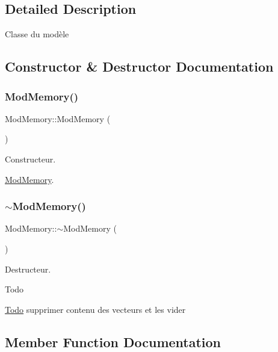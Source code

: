\subsection{Detailed Description}
Classe du modèle 

\subsection{Constructor \& Destructor Documentation}
\mbox{\label{class_mod_memory_a8604678a120d5f8e430d5d2248a44e36}} 
\subsubsection{\texorpdfstring{Mod\+Memory()}{ModMemory()}}
{\footnotesize\ttfamily Mod\+Memory\+::\+Mod\+Memory (\begin{DoxyParamCaption}{ }\end{DoxyParamCaption})}



Constructeur. 

\hyperlink{class_mod_memory}{Mod\+Memory}. \mbox{\label{class_mod_memory_a77d39288e861c84edcfa760170fbc44d}} 
\subsubsection{\texorpdfstring{$\sim$\+Mod\+Memory()}{~ModMemory()}}
{\footnotesize\ttfamily Mod\+Memory\+::$\sim$\+Mod\+Memory (\begin{DoxyParamCaption}{ }\end{DoxyParamCaption})}



Destructeur. 

\begin{DoxyRefDesc}{Todo}
\item[\hyperlink{todo__todo000013}{Todo}]supprimer contenu des vecteurs et les vider \end{DoxyRefDesc}


\subsection{Member Function Documentation}
\mbox{\label{class_mod_memory_a67247c021d8bf91192c2c32c1eb560ad}} 
